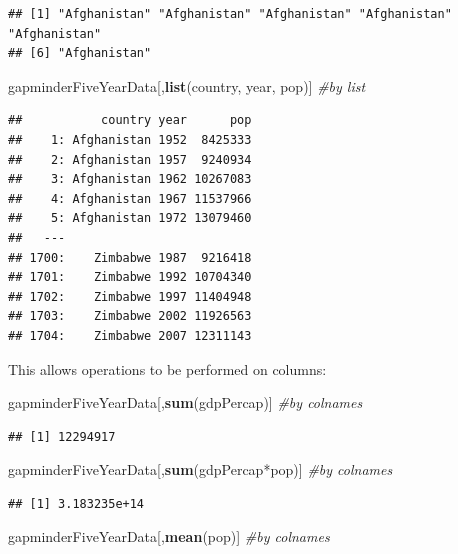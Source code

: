 \documentclass[]{article}
\newenvironment{Shaded}{\begin{snugshade}}{\end{snugshade}}
\newcommand{\KeywordTok}[1]{\textcolor[rgb]{0.13,0.29,0.53}{\textbf{{#1}}}}
\newcommand{\CommentTok}[1]{\textcolor[rgb]{0.56,0.35,0.01}{\textit{{#1}}}}
\newcommand{\NormalTok}[1]{{#1}}
\begin{document}
\begin{verbatim}
## [1] "Afghanistan" "Afghanistan" "Afghanistan" "Afghanistan" "Afghanistan"
## [6] "Afghanistan"
\end{verbatim}

\begin{Shaded}
\begin{Highlighting}[]
\NormalTok{gapminderFiveYearData[,}\KeywordTok{list}\NormalTok{(country, year, pop)] }\CommentTok{#by list}
\end{Highlighting}
\end{Shaded}

\begin{verbatim}
##           country year      pop
##    1: Afghanistan 1952  8425333
##    2: Afghanistan 1957  9240934
##    3: Afghanistan 1962 10267083
##    4: Afghanistan 1967 11537966
##    5: Afghanistan 1972 13079460
##   ---                          
## 1700:    Zimbabwe 1987  9216418
## 1701:    Zimbabwe 1992 10704340
## 1702:    Zimbabwe 1997 11404948
## 1703:    Zimbabwe 2002 11926563
## 1704:    Zimbabwe 2007 12311143
\end{verbatim}

This allows operations to be performed on columns:

\begin{Shaded}
\begin{Highlighting}[]
\NormalTok{gapminderFiveYearData[,}\KeywordTok{sum}\NormalTok{(gdpPercap)] }\CommentTok{#by colnames}
\end{Highlighting}
\end{Shaded}

\begin{verbatim}
## [1] 12294917
\end{verbatim}

\begin{Shaded}
\begin{Highlighting}[]
\NormalTok{gapminderFiveYearData[,}\KeywordTok{sum}\NormalTok{(gdpPercap*pop)] }\CommentTok{#by colnames}
\end{Highlighting}
\end{Shaded}

\begin{verbatim}
## [1] 3.183235e+14
\end{verbatim}

\begin{Shaded}
\begin{Highlighting}[]
\NormalTok{gapminderFiveYearData[,}\KeywordTok{mean}\NormalTok{(pop)] }\CommentTok{#by colnames}
\end{Highlighting}
\end{Shaded}
\end{document}
